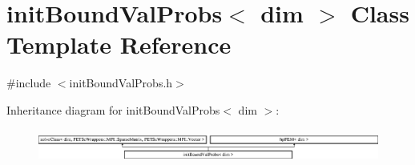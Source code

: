 \section{init\-Bound\-Val\-Probs$<$ dim $>$ Class Template Reference}
\label{classinit_bound_val_probs}


{\ttfamily \#include $<$init\-Bound\-Val\-Probs.\-h$>$}

Inheritance diagram for init\-Bound\-Val\-Probs$<$ dim $>$\-:\begin{figure}[H]
\begin{center}
\leavevmode
\includegraphics[height=1.100196cm]{classinit_bound_val_probs}
\end{center}
\end{figure}
